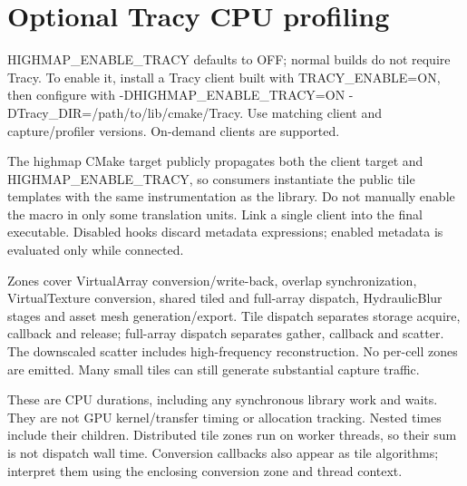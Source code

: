 \chapter{Optional Tracy CPU profiling}
\hypertarget{md_docs_2profiling}{}\label{md_docs_2profiling}
\label{md_docs_2profiling_autotoc_md49}%
%
 {\ttfamily HIGHMAP\+\_\+\+ENABLE\+\_\+\+TRACY} defaults to {\ttfamily OFF}; normal builds do not require Tracy. To enable it, install a Tracy client built with {\ttfamily TRACY\+\_\+\+ENABLE=ON}, then configure with {\ttfamily -\/DHIGHMAP\+\_\+\+ENABLE\+\_\+\+TRACY=ON -\/DTracy\+\_\+\+DIR=/path/to/lib/cmake/\+Tracy}. Use matching client and capture/profiler versions. On-\/demand clients are supported.

The {\ttfamily highmap} CMake target publicly propagates both the client target and {\ttfamily HIGHMAP\+\_\+\+ENABLE\+\_\+\+TRACY}, so consumers instantiate the public tile templates with the same instrumentation as the library. Do not manually enable the macro in only some translation units. Link a single client into the final executable. Disabled hooks discard metadata expressions; enabled metadata is evaluated only while connected.

Zones cover Virtual\+Array conversion/write-\/back, overlap synchronization, Virtual\+Texture conversion, shared tiled and full-\/array dispatch, Hydraulic\+Blur stages and asset mesh generation/export. Tile dispatch separates storage acquire, callback and release; full-\/array dispatch separates gather, callback and scatter. The downscaled scatter includes high-\/frequency reconstruction. No per-\/cell zones are emitted. Many small tiles can still generate substantial capture traffic.

These are CPU durations, including any synchronous library work and waits. They are not GPU kernel/transfer timing or allocation tracking. Nested times include their children. Distributed tile zones run on worker threads, so their sum is not dispatch wall time. Conversion callbacks also appear as tile algorithms; interpret them using the enclosing conversion zone and thread context. 